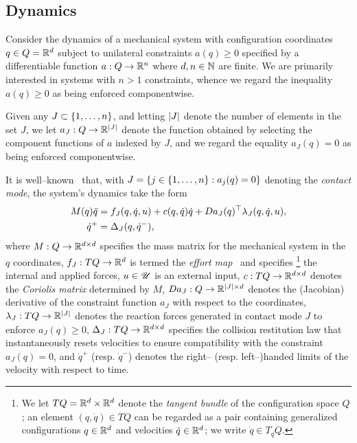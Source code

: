 \documentclass{article}
\begin{document}
\subsection{Dynamics}
\label{sec:dyn}
Consider the dynamics of a mechanical system with configuration coordinates $q\in Q=\mathbb{R}^d$ subject to 
unilateral constraints $a(q) \ge 0$ 
specified by a differentiable function 
$a : Q\rightarrow \mathbb{R}^n$
where $d,n\in\mathbb{N}$ are finite.
We are primarily interested in systems with $n > 1$ constraints,  
whence we regard the inequality $a(q) \ge 0$ as being enforced componentwise.

Given any $J\subset\left\{ 1,\dots,n \right\}$, 
and letting $\left| J \right|$ denote the number of elements in the set $J$,
we let 
$a_J : Q \rightarrow \mathbb{R}^{\left| J \right|}$ 
denote the function obtained by selecting the component functions of $a$ indexed by $J$, 
and we regard the equality $a_J(q) = 0$ as being enforced componentwise.

It is well--known~
that, with
$J = \left\{ j\in\left\{ 1,\dots,n \right\} : a_j(q) = 0 \right\}$ 
denoting the \emph{contact mode},
the system's dynamics take the form
\begin{subequations}\label{eq:dyn}
\begin{align}
  M(q)\ddot{q} & = f_J(q,\dot{q},u) + c(q,\dot{q})\dot{q} + Da_J(q)^\top \lambda_J(q,\dot{q},u),\label{eq:dyn:cont}\\
  \dot{q}^+ & = \Delta_J(q,\dot{q}^-),\label{eq:dyn:disc}
\end{align}
\end{subequations}
where
$M : Q \rightarrow \mathbb{R}^{d\times d}$
specifies the mass matrix for the mechanical system in the $q$ coordinates,
$f_J : TQ \rightarrow \mathbb{R}^d$ 
is termed the \emph{effort map}~\cite{Ballard2000-ui}
and specifies%
\footnote{We let $TQ = \mathbb{R}^d\times\mathbb{R}^d$ denote the \emph{tangent bundle} of the configuration space $Q$; an element $(q,\dot{q})\in TQ$ can be regarded as a pair containing generalized configurations $q\in\mathbb{R}^d$ and velocities $\dot{q}\in\mathbb{R}^d$; we write $\dot{q}\in T_q Q$.}
the internal and applied
forces, 
$u\in\mathscr{U}$ is an external input,
$c : TQ \rightarrow \mathbb{R}^{d\times d}$ 
denotes the \emph{Coriolis matrix} 
determined by $M$,
$Da_J : Q \rightarrow \mathbb{R}^{\left| J \right|\times d}$ 
denotes the (Jacobian) derivative of the constraint function $a_J$ with respect to the coordinates,
$\lambda_J : TQ \rightarrow \mathbb{R}^{\left| J \right|}$ 
denotes the reaction forces generated in contact mode $J$ to enforce $a_J(q) \ge 0$,
$\Delta_J : TQ \rightarrow \mathbb{R}^{d\times d}$ 
specifies the collision restitution law that instantaneously resets velocities to ensure compatibility with the constraint $a_J(q) = 0$,
%
and
$\dot{q}^+$ (resp. $\dot{q}^-$) denotes the right-- (resp. left--)handed limits of the velocity with respect to time.
%
\end{document}
